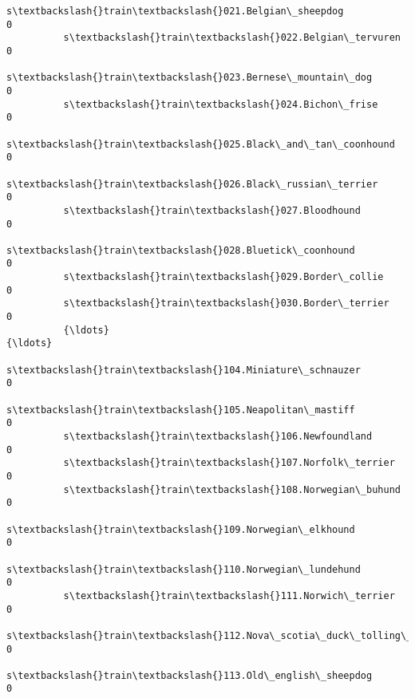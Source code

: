 \documentclass[11pt]{article}
\begin{document}
\begin{Verbatim}[commandchars=\\\{\}]
          s\textbackslash{}train\textbackslash{}021.Belgian\_sheepdog                                                     0   
          s\textbackslash{}train\textbackslash{}022.Belgian\_tervuren                                                     0   
          s\textbackslash{}train\textbackslash{}023.Bernese\_mountain\_dog                                                 0   
          s\textbackslash{}train\textbackslash{}024.Bichon\_frise                                                         0   
          s\textbackslash{}train\textbackslash{}025.Black\_and\_tan\_coonhound                                              0   
          s\textbackslash{}train\textbackslash{}026.Black\_russian\_terrier                                                0   
          s\textbackslash{}train\textbackslash{}027.Bloodhound                                                           0   
          s\textbackslash{}train\textbackslash{}028.Bluetick\_coonhound                                                   0   
          s\textbackslash{}train\textbackslash{}029.Border\_collie                                                        0   
          s\textbackslash{}train\textbackslash{}030.Border\_terrier                                                       0   
          {\ldots}                                                                            {\ldots}   
          s\textbackslash{}train\textbackslash{}104.Miniature\_schnauzer                                                  0   
          s\textbackslash{}train\textbackslash{}105.Neapolitan\_mastiff                                                   0   
          s\textbackslash{}train\textbackslash{}106.Newfoundland                                                         0   
          s\textbackslash{}train\textbackslash{}107.Norfolk\_terrier                                                      0   
          s\textbackslash{}train\textbackslash{}108.Norwegian\_buhund                                                     0   
          s\textbackslash{}train\textbackslash{}109.Norwegian\_elkhound                                                   0   
          s\textbackslash{}train\textbackslash{}110.Norwegian\_lundehund                                                  0   
          s\textbackslash{}train\textbackslash{}111.Norwich\_terrier                                                      0   
          s\textbackslash{}train\textbackslash{}112.Nova\_scotia\_duck\_tolling\_retriever                                   0   
          s\textbackslash{}train\textbackslash{}113.Old\_english\_sheepdog                                                 0   

\end{Verbatim}
\end{document}
